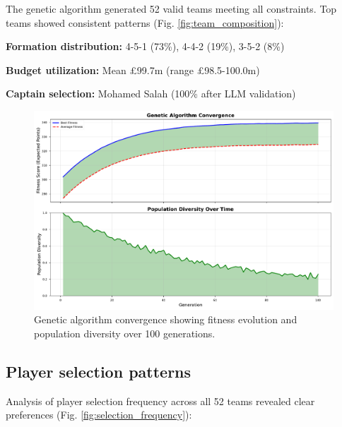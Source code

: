 \documentclass[10pt,a4paper,twocolumn]{article}
\begin{document}
The genetic algorithm generated 52 valid teams meeting all constraints. Top teams showed consistent patterns (Fig. \ref{fig:team_composition}):

\textbf{Formation distribution:} 4-5-1 (73\%), 4-4-2 (19\%), 3-5-2 (8\%)

\textbf{Budget utilization:} Mean £99.7m (range £98.5-100.0m)

\textbf{Captain selection:} Mohamed Salah (100\% after LLM validation)

\begin{figure}[h]
\centering
\includegraphics[width=\columnwidth]{figures/optimization_performance.pdf}
\caption{Genetic algorithm convergence showing fitness evolution and population diversity over 100 generations.}
\label{fig:optimization}
\end{figure}



\subsection*{Player selection patterns}

Analysis of player selection frequency across all 52 teams revealed clear preferences (Fig. \ref{fig:selection_frequency}):
\end{document}
